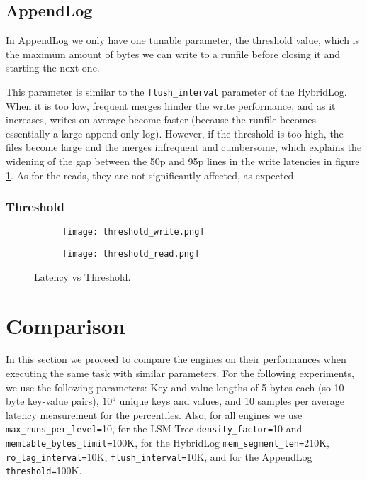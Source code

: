 \subsection{AppendLog}

In AppendLog we only have one tunable parameter, the threshold value, which is the maximum amount of bytes we can write to a runfile before closing it and starting the next one.

This parameter is similar to the \verb"flush_interval" parameter of the HybridLog. When it is too low, frequent merges hinder the write performance, and as it increases, writes on average become faster (because the runfile becomes essentially a large append-only log). However, if the threshold is too high, the files become large and the merges infrequent and cumbersome, which explains the widening of the gap between the 50p and 95p lines in the write latencies in figure \ref{fig:threshold_write_read}. As for the reads, they are not significantly affected, as expected.

\subsubsection{Threshold}

\begin{figure}[H]
    \begin{subfigure}{.5\textwidth}
        \centering
        \texttt{[image: threshold\_write.png]}
    \end{subfigure}
    \begin{subfigure}{.5\textwidth}
        \centering
        \texttt{[image: threshold\_read.png]}
    \end{subfigure}
    \caption{Latency vs Threshold.}
    \label{fig:threshold_write_read}
\end{figure}

\section{Comparison}

In this section we proceed to compare the engines on their performances when executing the same task with similar parameters. For the following experiments, we use the following parameters: Key and value lengths of 5 bytes each (so 10-byte key-value pairs), $10^5$ unique keys and values, and 10 samples per average latency measurement for the percentiles. Also, for all engines we use \verb"max_runs_per_level="10, for the LSM-Tree \verb"density_factor="10 and \verb"memtable_bytes_limit="100K, for the HybridLog \verb"mem_segment_len="210K, \verb"ro_lag_interval="10K, \verb"flush_interval="10K, and for the AppendLog \verb"threshold="100K.

